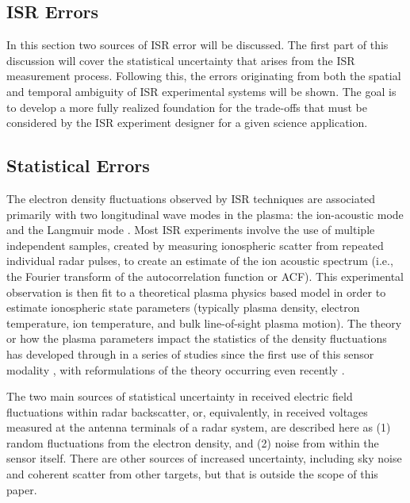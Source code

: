 \documentclass[draft,ras]{agutex}
\begin{document}
\begin{article}
\section{ISR Errors}

In this section two sources of ISR error will be discussed. The first part of this discussion will cover the statistical uncertainty that arises from the ISR measurement process. Following this, the errors originating from both the spatial and temporal ambiguity of ISR experimental systems will be shown. The goal is to develop a more fully realized foundation for the trade-offs that must be considered by the ISR experiment designer for a given science application.

\subsection{Statistical Errors}

The electron density fluctuations observed by ISR techniques are associated primarily with two longitudinal wave modes in the plasma: the ion-acoustic mode and the Langmuir mode \citep{evans;isr}.  Most ISR experiments involve the use of multiple independent samples, created by measuring ionospheric scatter from repeated individual radar pulses, to create an estimate of the ion acoustic spectrum (i.e., the Fourier transform of the autocorrelation function or ACF). This experimental observation is then fit to a theoretical plasma physics based model in order to estimate ionospheric state parameters (typically plasma density, electron temperature, ion temperature, and bulk line-of-sight plasma motion). The theory or how the plasma parameters impact the statistics of the density fluctuations has developed through in a series of studies since the first use of this sensor modality \citep{gordon58,dougherty:farley1960, farleydougherty:ISR2, doughteryfarley:ISR3, hagfors1961}, with reformulations of the theory occurring even recently  \citep{kudeki:milla:1,kudeki:milla:2}. 

The two main sources of statistical uncertainty in received electric field fluctuations within radar backscatter, or, equivalently, in received voltages measured at the antenna terminals of a radar system, are described here as (1) random fluctuations from the electron density, and (2) noise from within the sensor itself. There are other sources of increased uncertainty, including sky noise and coherent scatter from other targets, but that is outside the scope of this paper.


\end{article}
\end{document}

